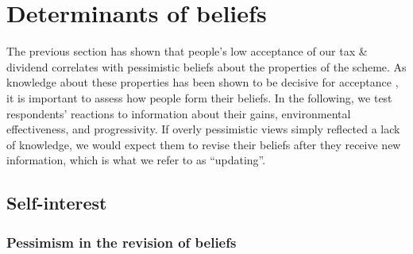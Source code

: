 \documentclass[12pt]{article} %
\begin{document}
\section{Determinants of beliefs \label{sec:persistence}}


The previous section has shown that people's low acceptance of our tax \& dividend correlates with pessimistic beliefs about the properties of the scheme. As knowledge about these properties has been shown to be decisive for acceptance \citep{carattini_overcoming_2018}, it is important to assess how people form their beliefs. In the following, we test respondents' reactions to information about their gains, environmental effectiveness, and progressivity. If overly pessimistic views simply reflected a lack of knowledge, we would expect them to revise their beliefs after they receive new information, which is what we refer to as ``updating''. %

\subsection{Self-interest}\label{subsec:update_si}

\subsubsection{Pessimism in the revision of beliefs\label{subsubsec:update_after_feedback}} %
\end{document}
